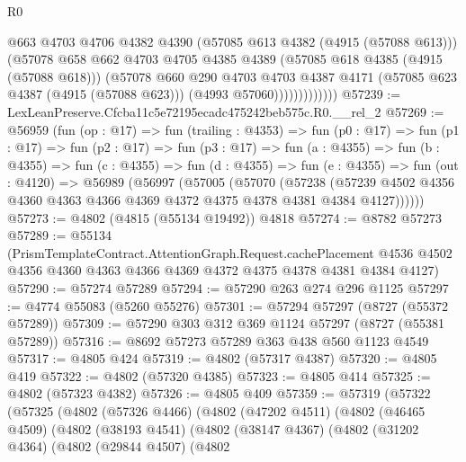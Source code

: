 \begin{lexlean}{R0}
\begin{coremodule}
                        @663
                        @4703
                        @4706
                        @4382
                        @4390
                        (@57085 @613 @4382 (@4915 (@57088 @613)))
                        (@57078
                          @658
                          @662
                          @4703
                          @4705
                          @4385
                          @4389
                          (@57085 @618 @4385 (@4915 (@57088 @618)))
                          (@57078
                            @660
                            @290
                            @4703
                            @4703
                            @4387
                            @4171
                            (@57085 @623 @4387 (@4915 (@57088 @623)))
                            (@4993 @57060)))))))))))))
@57239 := LexLeanPreserve.Cfcba11c5e72195ecadc475242beb575c.R0.__rel_2
@57269 := @56959
    (fun (op : @17) =>
    fun (trailing : @4353) =>
    fun (p0 : @17) =>
    fun (p1 : @17) =>
    fun (p2 : @17) =>
    fun (p3 : @17) =>
    fun (a : @4355) =>
    fun (b : @4355) =>
    fun (c : @4355) =>
    fun (d : @4355) =>
    fun (e : @4355) =>
    fun (out : @4120) =>
    @56989
      (@56997
        (@57005
          (@57070
            (@57238
              (@57239 @4502 @4356 @4360 @4363 @4366 @4369 @4372 @4375 @4378 @4381 @4384 @4127))))))
@57273 := @4802 (@4815 (@55134 @19492)) @4818
@57274 := @8782 @57273
@57289 := @55134
    (PrismTemplateContract.AttentionGraph.Request.cachePlacement
      @4536
      @4502
      @4356
      @4360
      @4363
      @4366
      @4369
      @4372
      @4375
      @4378
      @4381
      @4384
      @4127)
@57290 := @57274 @57289
@57294 := @57290 @263 @274 @296 @1125
@57297 := @4774 @55083 (@5260 @55276)
@57301 := @57294 @57297 (@8727 (@55372 @57289))
@57309 := @57290 @303 @312 @369 @1124 @57297 (@8727 (@55381 @57289))
@57316 := @8692 @57273 @57289 @363 @438 @560 @1123 @4549
@57317 := @4805 @424
@57319 := @4802 (@57317 @4387)
@57320 := @4805 @419
@57322 := @4802 (@57320 @4385)
@57323 := @4805 @414
@57325 := @4802 (@57323 @4382)
@57326 := @4805 @409
@57359 := @57319
    (@57322
      (@57325
        (@4802
          (@57326 @4466)
          (@4802
            (@47202 @4511)
            (@4802
              (@46465 @4509)
              (@4802
                (@38193 @4541)
                (@4802
                  (@38147 @4367)
                  (@4802
                    (@31202 @4364)
                    (@4802
                      (@29844 @4507)
                      (@4802

\end{coremodule}
\end{lexlean}
